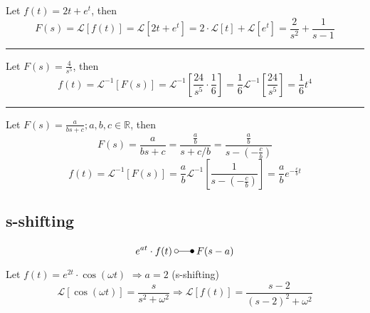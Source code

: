 \begin{examplesection}[Example]
    Let $f(t)=2t+e^t$, then
    \begin{equation*}
        F(s)=\mathcal{L}[f(t)]=\mathcal{L}[2t+e^t]=2\cdot\mathcal{L}[t] + \mathcal{L}[e^t]=\frac{2}{s^2}+\frac{1}{s-1}
    \end{equation*}
    \hrule{}
    Let $F(s)=\frac{4}{s^5}$, then
    \begin{equation*}
        f(t)=\mathcal{L}^{-1}[F(s)]=\mathcal{L}^{-1}\left[\frac{24}{s^5}\cdot\frac16\right]=\frac16\mathcal{L}^{-1}\left[\frac{24}{s^5}\right]=\frac16t^4
    \end{equation*}
    \hrule{}
    Let $F(s)=\frac{a}{bs+c}; a,b,c \in \mathbb{R}$, then
    \begin{equation*}
        F(s)=\frac{a}{bs+c}=\frac{\frac{a}{b}}{s+c/b}=\frac{\frac{a}{b}}{s-(-\frac{c}{b})}
    \end{equation*}
    \begin{equation*}
        f(t)=\mathcal{L}^{-1}[F(s)]=\frac{a}{b}\mathcal{L}^{-1}\left[\frac{1}{s-(-\frac{c}{b})}\right]=\frac{a}{b}e^{-\frac{c}{b}t}
    \end{equation*}
\end{examplesection}

\subsection{s-shifting}
\begin{equation*}
    e^{at}\cdot f(t)\:\laplace\:F(s-a)
\end{equation*}
\begin{examplesection}[Example]
    Let $f(t)=e^{2t}\cdot \cos(\omega t)$ $\Rightarrow a=2$ (s-shifting)
    \begin{equation*}
        \mathcal{L}[\cos(\omega t)]=\frac{s}{s^2+\omega ^2}\Rightarrow \mathcal{L}[f(t)]=\frac{s-2}{{(s-2)}^2+\omega ^2}
    \end{equation*}
\end{examplesection}

